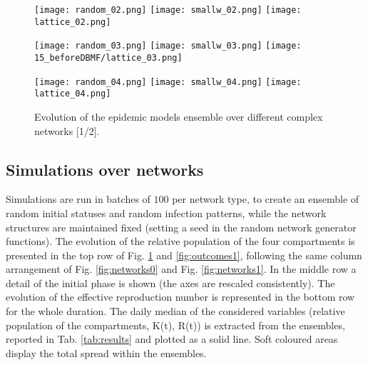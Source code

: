 \documentclass[DIV=12, BCOR=0pt]{scrartcl}  %
\begin{document}
  \begin{figure}[h!]
  	\centering
  	\texttt{[image: random\_02.png]}
  	\texttt{[image: smallw\_02.png]}
  	\texttt{[image: lattice\_02.png]}
  	
  	\texttt{[image: random\_03.png]}
  	\texttt{[image: smallw\_03.png]}
  	\texttt{[image: 15\_beforeDBMF/lattice\_03.png]}
  	
  	\texttt{[image: random\_04.png]}
  	\texttt{[image: smallw\_04.png]}
  	\texttt{[image: lattice\_04.png]}
  	
  	\caption{Evolution of the epidemic models ensemble over different complex networks [1/2].}
  	\label{fig:outcomes0}
  \end{figure}
  \clearpage

  
  \subsection{Simulations over networks}
  Simulations are run in batches of $100$ per network type, to create an ensemble of random initial statuses and random infection patterns, while the network structures are maintained fixed (setting a seed in the random network generator functions). The evolution of the relative population of the four compartments is presented in the top row of Fig. \ref{fig:outcomes0} and \ref{fig:outcomes1}, following the same column arrangement of Fig. \ref{fig:networks0} and Fig. \ref{fig:networks1}. In the middle row a detail of the initial phase is shown (the axes are rescaled consistently). The evolution of the effective reproduction number is represented in the bottom row for the whole duration. The daily median of the considered variables (relative population of the compartments, K(t), R(t)) is extracted from the ensembles, reported in Tab. \ref{tab:results} and plotted as a solid line. Soft coloured areas display the total spread within the ensembles.
  
  
\end{document}
